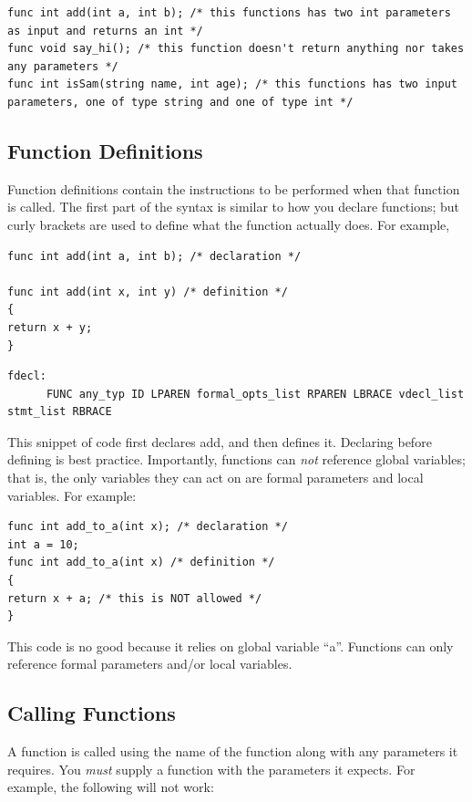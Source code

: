 \documentclass{article}
\begin{document}
\begin{lstlisting}
func int add(int a, int b); /* this functions has two int parameters as input and returns an int */
func void say_hi(); /* this function doesn't return anything nor takes any parameters */
func int isSam(string name, int age); /* this functions has two input parameters, one of type string and one of type int */
\end{lstlisting}

\subsection{Function Definitions}
Function definitions contain the instructions to be performed when that function is called. The first part of the syntax is similar to how you declare functions; but curly brackets are used to define what the function actually does. For example, 

\begin{lstlisting}
func int add(int a, int b); /* declaration */

func int add(int x, int y) /* definition */
{
return x + y;
}
\end{lstlisting}

\begin{Verbatim}[frame=single]
fdecl:
	  FUNC any_typ ID LPAREN formal_opts_list RPAREN LBRACE vdecl_list stmt_list RBRACE
\end{Verbatim}

This snippet of code first declares add, and then defines it. Declaring before defining is best practice. Importantly, functions can \emph{not} reference global variables; that is, the only variables they can act on are formal parameters and local variables. For example:

\begin{lstlisting}
func int add_to_a(int x); /* declaration */
int a = 10;
func int add_to_a(int x) /* definition */
{
return x + a; /* this is NOT allowed */
}
\end{lstlisting}

This code is no good because it relies on global variable ``a''. Functions can only reference formal parameters and/or local variables.

\subsection{Calling Functions}

A function is called using the name of the function along with any parameters it requires. You \emph{must} supply a function with the parameters it expects. For example, the following will not work:
\end{document}
